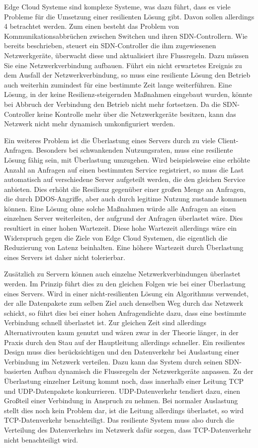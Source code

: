 Edge Cloud Systeme sind komplexe Systeme, was dazu führt, dass es viele Probleme für die Umsetzung einer resilienten Lösung gibt. Davon sollen allerdings 4 betrachtet werden.
Zum einen besteht das Problem von Kommunikationsabbrüchen zwischen Switchen und ihren SDN-Controllern. Wie bereits beschrieben, steuert ein SDN-Controller die ihm zugewiesenen Netzwerkgeräte, 
überwacht diese und aktualisiert ihre Flussregeln. Dazu müssen Sie eine Netzwerkverbindung aufbauen. Führt ein nicht erwartetes Ereignis zu dem Ausfall der Netzwerkverbindung, 
so muss eine resiliente Lösung den Betrieb auch weiterhin zumindest für eine bestimmte Zeit lange weiterführen. Eine Lösung, in der keine Resilienz-steigernden Maßnahmen eingebaut wurden, 
könnte bei Abbruch der Verbindung den Betrieb nicht mehr fortsetzen. Da die SDN-Controller keine Kontrolle mehr über die Netzwerkgeräte besitzen, kann das Netzwerk nicht mehr dynamisch umkonfiguriert werden.

Ein weiteres Problem ist die Überlastung eines Servers durch zu viele Client-Anfragen. Besonders bei schwankenden Nutzungsraten, muss eine resiliente Lösung fähig sein, mit Überlastung umzugehen. 
Wird beispielsweise eine erhöhte Anzahl an Anfragen auf einen bestimmten Service registriert, so muss die Last automatisch auf verschiedene Server aufgeteilt werden, die den gleichen Service anbieten. 
Dies erhöht die Resilienz gegenüber einer großen Menge an Anfragen, die durch DDOS-Angriffe, aber auch durch legitime Nutzung zustande kommen können. 
Eine Lösung ohne solche Maßnahmen würde alle Anfragen an einen einzelnen Server weiterleiten, der aufgrund der Anfragen überlastet wäre. Dies resultiert in einer hohen Wartezeit. 
Diese hohe Wartezeit allerdings wäre ein Widerspruch gegen die Ziele von Edge Cloud Systemen, die eigentlich die Reduzierung von Latenz beinhalten. 
Eine höhere Wartezeit durch Überlastung eines Servers ist daher nicht tolerierbar.

Zusätzlich zu Servern können auch einzelne Netzwerkverbindungen überlastet werden. Im Prinzip führt dies zu den gleichen Folgen wie bei einer Überlastung eines Servers. 
Wird in einer nicht-resilienten Lösung ein Algorithmus verwendet, der alle Datenpakete zum selben Ziel auch denselben Weg durch das Netzwerk schickt, so führt dies bei einer hohen Anfragendichte dazu, 
dass eine bestimmte Verbindung schnell überlastet ist. Zur gleichen Zeit sind allerdings Alternativrouten kaum genutzt und wären zwar in der Theorie länger, 
in der Praxis durch den Stau auf der Hauptleitung allerdings schneller. Ein resilientes Design muss dies berücksichtigen und den Datenverkehr bei Auslastung einer Verbindung im Netzwerk verteilen. 
Dazu kann das System durch seinen SDN-basierten Aufbau dynamisch die Flussregeln der Netzwerkgeräte anpassen. Zu der Überlastung einzelner Leitung kommt noch, dass innerhalb einer Leitung TCP und UDP-Datenpakete konkurrieren. 
UDP-Datenverkehr tendiert dazu, einen Großteil einer Verbindung in Anspruch zu nehmen. Bei normaler Auslastung stellt dies noch kein Problem dar, ist die Leitung allerdings überlastet, so wird TCP-Datenverkehr benachteiligt. 
Das resiliente System muss also durch die Verteilung des Datenverkehrs im Netzwerk dafür sorgen, dass TCP-Datenverkehr nicht benachteiligt wird.

